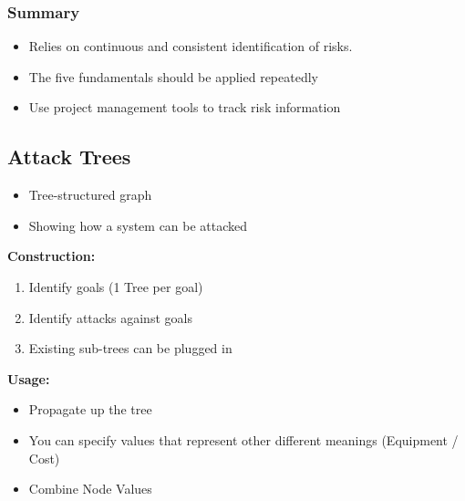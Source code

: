 \subsubsection{Summary}
\begin{itemize}
    \item Relies on continuous and consistent identification of risks.
    \item The five fundamentals should be applied repeatedly
    \item Use project management tools to track risk information
\end{itemize}

\subsection{Attack Trees}
\begin{itemize}
    \item Tree-structured graph
    \item Showing how a system can be attacked
\end{itemize}
\textbf{Construction:}
\begin{enumerate}
    \item Identify goals (1 Tree per goal)
    \item Identify attacks against goals
    \item Existing sub-trees can be plugged in
\end{enumerate}
\textbf{Usage:}
\begin{itemize}
    \item Propagate up the tree
    \item You can specify values that represent other different meanings (Equipment / Cost)
    \item Combine Node Values
\end{itemize}

